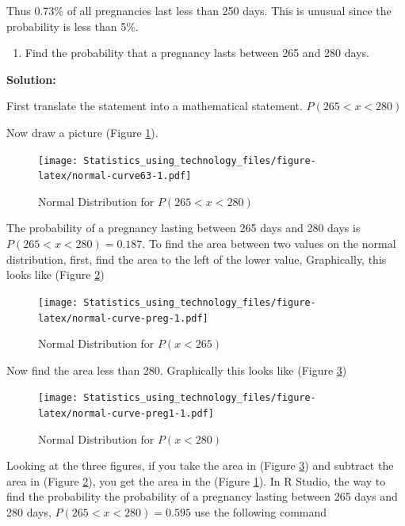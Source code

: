 \documentclass[
]{book}
\providecommand{\tightlist}{%
  \setlength{\itemsep}{0pt}\setlength{\parskip}{0pt}}
\begin{document}
Thus 0.73\% of all pregnancies last less than 250 days. This is unusual since the probability is less than 5\%.

\begin{enumerate}
\def\labelenumi{\alph{enumi}.}
\setcounter{enumi}{3}
\tightlist
\item
  Find the probability that a pregnancy lasts between 265 and 280 days.
\end{enumerate}

\textbf{Solution:}

First translate the statement into a mathematical statement. \(P(265<x<280)\)

Now draw a picture (Figure \ref{fig:normal-curve63}).



\begin{figure}
\centering
\texttt{[image: Statistics\_using\_technology\_files/figure-latex/normal-curve63-1.pdf]}
\caption{\label{fig:normal-curve63}Normal Distribution for \(P(265<x<280)\)}
\end{figure}

The probability of a pregnancy lasting between 265 days and 280 days is \(P(265<x<280)=0.187\). To find the area between two values on the normal distribution, first, find the area to the left of the lower value, Graphically, this looks like (Figure \ref{fig:normal-curve-preg})



\begin{figure}
\centering
\texttt{[image: Statistics\_using\_technology\_files/figure-latex/normal-curve-preg-1.pdf]}
\caption{\label{fig:normal-curve-preg}Normal Distribution for \(P(x<265)\)}
\end{figure}

Now find the area less than 280. Graphically this looks like (Figure \ref{fig:normal-curve-preg1})



\begin{figure}
\centering
\texttt{[image: Statistics\_using\_technology\_files/figure-latex/normal-curve-preg1-1.pdf]}
\caption{\label{fig:normal-curve-preg1}Normal Distribution for \(P(x<280)\)}
\end{figure}

Looking at the three figures, if you take the area in (Figure \ref{fig:normal-curve-preg1}) and subtract the area in (Figure \ref{fig:normal-curve-preg}), you get the area in the (Figure \ref{fig:normal-curve63}). In R Studio, the way to find the probability the probability of a pregnancy lasting between 265 days and 280 days, \(P(265<x<280)=0.595\) use the following command
\end{document}
